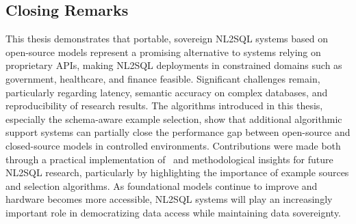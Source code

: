 \subsection{Closing Remarks}

This thesis demonstrates that portable, sovereign NL2SQL systems based on
open-source models represent a promising alternative to systems relying on
proprietary APIs, making NL2SQL deployments in constrained domains such as
government, healthcare, and finance feasible. Significant challenges remain,
particularly regarding latency, semantic accuracy on complex databases, and
reproducibility of research results. The algorithms introduced in this thesis,
especially the schema-aware example selection, show that additional
algorithmic support systems can partially close the performance gap between
open-source and closed-source models in controlled environments. Contributions
were made both through a practical implementation of \Natural~and
methodological insights for future NL2SQL research, particularly by
highlighting the importance of example sources and selection algorithms. As
foundational models continue to improve and hardware becomes more accessible,
NL2SQL systems will play an increasingly important role in democratizing data
access while maintaining data sovereignty.
